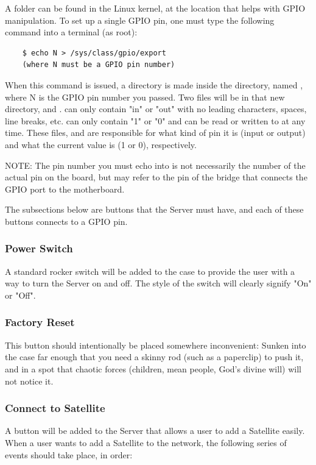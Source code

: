 A folder can be found in the Linux kernel, at the location  that helps with GPIO manipulation. 
To set up a single GPIO pin, one must type the following command into a terminal (as root):

\begin{lstlisting}
	$ echo N > /sys/class/gpio/export
	(where N must be a GPIO pin number)
\end{lstlisting}

When this command is issued, a directory is made inside the  directory, named , where N is the GPIO pin number you passed. 
Two files will be in that new directory,  and . 
 can only contain "in" or "out" with no leading characters, spaces, line breaks, etc.
 can only contain "1" or "0" and can be read or written to at any time.
These files,  and  are responsible for what kind of pin it is (input or output) and what the current value is (1 or 0), respectively.

NOTE: The pin number you must echo into  is not necessarily the number of the actual pin on the board, but may refer to the pin of the bridge that connects the GPIO port to the motherboard.

The subsections below are buttons that the Server must have, and each of these buttons connects to a GPIO pin.


\subsubsection{Power Switch}
A standard rocker switch will be added to the case to provide the user with a way to turn the Server on and off. 
The style of the switch will clearly signify "On" or "Off".

\subsubsection{Factory Reset}
This button should intentionally be placed somewhere inconvenient: 
Sunken into the case far enough that you need a skinny rod (such as a paperclip) to push it, and in a spot
that chaotic forces (children, mean people, God's divine will) will not notice it.

\subsubsection{Connect to Satellite}
A button will be added to the Server that allows a user to add a Satellite easily.
When a user wants to add a Satellite to the network, the following series of events should take place, in order:

